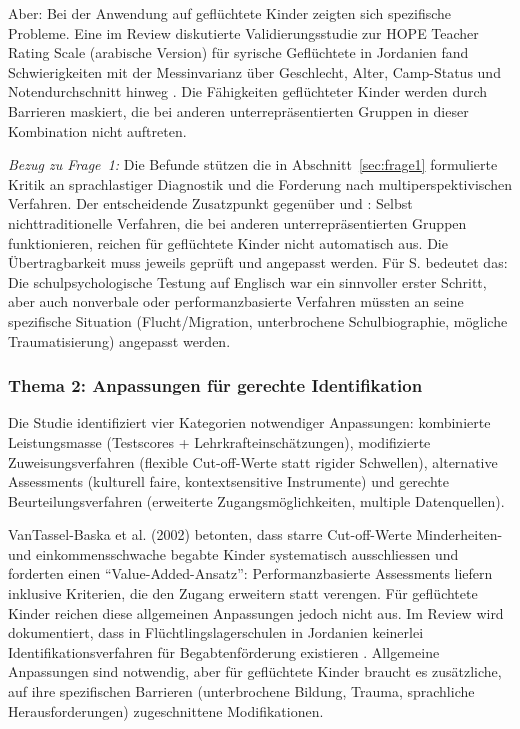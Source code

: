 \documentclass[ngerman, a4paper]{article}
\begin{document}
Aber: Bei der Anwendung auf geflüchtete Kinder zeigten sich spezifische
Probleme. Eine im Review diskutierte Validierungsstudie zur HOPE Teacher
Rating Scale (arabische Version) für syrische Geflüchtete in Jordanien
fand Schwierigkeiten mit der Messinvarianz über Geschlecht, Alter,
Camp-Status und Notendurchschnitt hinweg \parencite[S.\,10]{alodat2025equitable}.
Die Fähigkeiten geflüchteter Kinder werden durch Barrieren maskiert, die
bei anderen unterrepräsentierten Gruppen in dieser Kombination nicht
auftreten.

\textit{Bezug zu Frage~1:} Die Befunde stützen die in
Abschnitt~\ref{sec:frage1} formulierte Kritik an sprachlastiger Diagnostik
und die Forderung nach multiperspektivischen Verfahren. Der entscheidende
Zusatzpunkt gegenüber \textcite{mun2020identifying} und
\textcite{gubbins2020promising}: Selbst nichttraditionelle Verfahren, die
bei anderen unterrepräsentierten Gruppen funktionieren, reichen für
geflüchtete Kinder nicht automatisch aus. Die Übertragbarkeit muss jeweils
geprüft und angepasst werden. Für S. bedeutet das: Die schulpsychologische
Testung auf Englisch war ein sinnvoller erster Schritt, aber auch
nonverbale oder performanzbasierte Verfahren müssten an seine spezifische
Situation (Flucht/Migration, unterbrochene Schulbiographie, mögliche
Traumatisierung) angepasst werden.

\subsubsection*{Thema 2: Anpassungen für gerechte Identifikation}

Die Studie identifiziert vier Kategorien notwendiger Anpassungen:
kombinierte Leistungsmasse (Testscores + Lehrkrafteinschätzungen),
modifizierte Zuweisungsverfahren (flexible Cut-off-Werte statt rigider
Schwellen), alternative Assessments (kulturell faire, kontextsensitive
Instrumente) und gerechte Beurteilungsverfahren (erweiterte
Zugangsmöglichkeiten, multiple Datenquellen).

VanTassel-Baska et al. (2002) betonten, dass starre Cut-off-Werte
Minderheiten- und einkommensschwache begabte Kinder systematisch
ausschliessen und forderten einen \enquote{Value-Added-Ansatz}:
Performanzbasierte Assessments liefern inklusive Kriterien, die den Zugang
erweitern statt verengen. Für geflüchtete Kinder reichen diese allgemeinen
Anpassungen jedoch nicht aus. Im Review wird dokumentiert, dass in
Flüchtlingslagerschulen in Jordanien keinerlei Identifikationsverfahren
für Begabtenförderung existieren \parencite[S.\,12]{alodat2025equitable}.
Allgemeine Anpassungen sind notwendig, aber für geflüchtete Kinder braucht
es zusätzliche, auf ihre spezifischen Barrieren (unterbrochene Bildung,
Trauma, sprachliche Herausforderungen) zugeschnittene Modifikationen.
\end{document}
